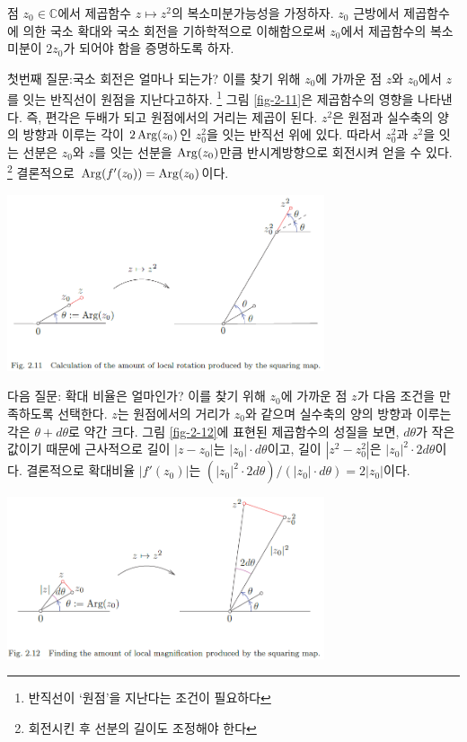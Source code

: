 \begin{saltexample}{}{} \label{example-2-12}
점 $z_0\in\mathbb C$에서 제곱함수  $z\mapsto z^2$의
복소미분가능성을 가정하자.
$z_0$ 근방에서 제곱함수에 의한  국소 확대와 국소 회전을 기하학적으로 이해함으로써
$z_0$에서 제곱함수의 복소미분이 $2z_0$가 되어야 함을 증명하도록 하자.

첫번째 질문:국소 회전은 얼마나 되는가?
이를 찾기 위해 $z_0$에 가까운 점 $z$와 $z_0$에서 $z$를 잇는 반직선이 원점을 지난다고하자.
\footnote{반직선이 `원점'을 지난다는 조건이 필요하다}
그림 \ref{fig-2-11}은 제곱함수의 영향을 나타낸다. 즉, 편각은 두배가 되고
원점에서의 거리는 제곱이 된다. 
 $z^2$은 원점과 
실수축의 양의 방향과 이루는 각이 $2\mathop{\mathrm{Arg}}(z_0)$인
$z_0^2$을 잇는 반직선 위에 있다.
따라서 $z_0^2$과 $z^2$을 잇는 선분은 
$z_0$와  $z$를 잇는 선분을 $\mathop{\mathrm{Arg}}(z_0)$만큼 반시계방향으로 회전시켜 얻을 수 있다. 
\footnote{회전시킨 후 선분의 길이도 조정해야 한다}
결론적으로  $\mathop{\mathrm{Arg}}(f'(z_0)) = \mathop{\mathrm{Arg}}(z_0)$이다.

\begin{center}
\includegraphics[width=0.7\textwidth]{./SaltChapter/fig-2-11}
\end{center}
\label{fig-2-11}


다음 질문: 확대 비율은 얼마인가?
이를 찾기 위해 $z_0$에 가까운 점 $z$가 다음 조건을 만족하도록 선택한다.
$z$는 원점에서의 거리가 $z_0$와 같으며 
실수축의 양의 방향과 이루는 각은 $\theta + d\theta$로 약간 크다.
그림 \ref{fig-2-12}에 표현된 제곱함수의 성질을 보면,
$d\theta$가 작은 값이기 때문에 근사적으로 길이 $|z-z_0|$는  $|z_0|\cdot d\theta$이고,
길이 $|z^2-z_0^2|$은 $|z_0|^2\cdot 2d\theta$이다.
결론적으로 확대비율 $|f'(z_0)|$는 $(|z_0|^2\cdot 2d\theta)/(|z_0|\cdot d\theta) = 2|z_0|$이다.


\begin{center}
\includegraphics[width=0.7\textwidth]{./SaltChapter/fig-2-12}
\end{center}
\label{fig-2-12}


\end{saltexample}
